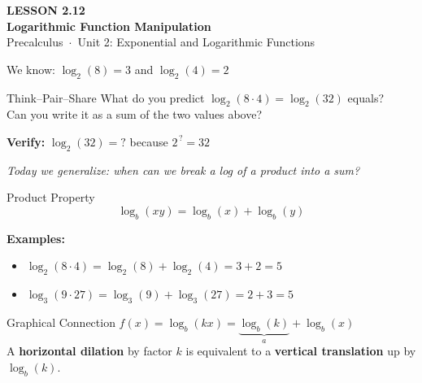 \documentclass[aspectratio=169, 11pt]{beamer}
\begin{document}
{
\begin{frame}[plain]
  \vspace{2.8cm}\hspace{0.55cm}%
  \begin{minipage}{0.9\textwidth}
    {\color{goldacc}\bfseries\small LESSON 2.12}\\[0.5cm]
    {\color{white}\bfseries\LARGE Logarithmic Function Manipulation}\\[1.2cm]
    {\color{skymid}\small Precalculus~$\cdot$~Unit 2: Exponential and Logarithmic Functions}
  \end{minipage}
\end{frame}
}

\begin{frame}[t, plain]

  \vspace{0.3cm}
  We know: \quad $\log_2(8) = 3$ \quad and \quad $\log_2(4) = 2$

  \vspace{0.5cm}
  \begin{block}{Think--Pair--Share}
    What do you predict $\log_2(8 \cdot 4) = \log_2(32)$ equals?\\[6pt]
    Can you write it as a sum of the two values above?
  \end{block}

  \vspace{0.5cm}
  \textbf{Verify:} $\log_2(32) = ?$ because $2^{\,?} = 32$

  \vspace{0.4cm}
  \textit{Today we generalize: when can we break a log of a product into a sum?}
\end{frame}

\begin{frame}[t, plain]

  \vspace{0.2cm}
  \begin{block}{Product Property}
    \[ \log_b(xy) = \log_b(x) + \log_b(y) \]
  \end{block}

  \vspace{0.3cm}
  \textbf{Examples:}
  \begin{itemize}
    \setlength{\itemsep}{6pt}
    \item $\log_2(8 \cdot 4) = \log_2(8) + \log_2(4) = 3 + 2 = 5$
    \item $\log_3(9 \cdot 27) = \log_3(9) + \log_3(27) = 2 + 3 = 5$
  \end{itemize}

  \vspace{0.35cm}
  \begin{block}{Graphical Connection}
    $f(x) = \log_b(kx) = \underbrace{\log_b(k)}_{a} + \log_b(x)$\\[4pt]
    A \textbf{horizontal dilation} by factor $k$ is equivalent to a
    \textbf{vertical translation} up by $\log_b(k)$.
  \end{block}
\end{frame}
\end{document}

